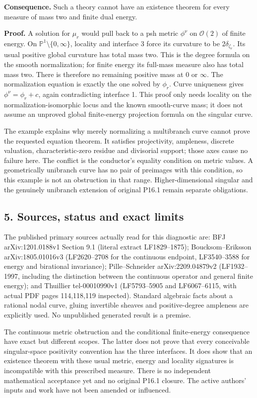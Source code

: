 \documentclass[
  11pt,
]{article}
\begin{document}
\textbf{Consequence.} Such a theory cannot have an existence theorem for
every measure of mass two and finite dual energy.

\textbf{Proof.} A solution for \(\mu_r\) would pull back to a psh metric
\(\phi^\nu\) on \(\mathcal O(2)\) of finite energy. On
\(\mathbb P^1\setminus\{0,\infty\}\), locality and interface 3 force its
curvature to be \(2\delta_{\zeta_r}\). Its usual positive global
curvature has total mass two. This is the degree formula on the smooth
normalization; for finite energy its full-mass measure also has total
mass two. There is therefore no remaining positive mass at \(0\) or
\(\infty\). The normalization equation is exactly the one solved by
\(\phi_r\). Curve uniqueness gives \(\phi^\nu=\phi_r+c\), again
contradicting interface 1. This proof only needs locality on the
normalization-isomorphic locus and the known smooth-curve mass; it does
not assume an unproved global finite-energy projection formula on the
singular curve.

The example explains why merely normalizing a multibranch curve cannot
prove the requested equation theorem. It satisfies projectivity,
ampleness, discrete valuation, characteristic-zero residue and
divisorial support; those axes cause no failure here. The conflict is
the conductor's equality condition on metric values. A geometrically
unibranch curve has no pair of preimages with this condition, so this
example is not an obstruction in that range. Higher-dimensional singular
and the genuinely unibranch extension of original P16.1 remain separate
obligations.

\subsection{5. Sources, status and exact
limits}\label{sources-status-and-exact-limits}

The published primary sources actually read for this diagnostic are: BFJ
arXiv:1201.0188v1 Section 9.1 (literal extract LF1829--1875);
Boucksom--Eriksson arXiv:1805.01016v3 (LF2620--2708 for the continuous
endpoint, LF3540--3588 for energy and birational invariance);
Pille--Schneider arXiv:2209.04879v2 (LF1932--1997, including the
distinction between the continuous operator and general finite energy);
and Thuillier tel-00010990v1 (LF5793--5905 and LF6067--6115, with actual
PDF pages 114,118,119 inspected). Standard algebraic facts about a
rational nodal curve, gluing invertible sheaves and positive-degree
ampleness are explicitly used. No unpublished generated result is a
premise.

The continuous metric obstruction and the conditional finite-energy
consequence have exact but different scopes. The latter does not prove
that every conceivable singular-space positivity convention has the
three interfaces. It does show that an existence theorem with these
usual metric, energy and locality signatures is incompatible with this
prescribed measure. There is no independent mathematical acceptance yet
and no original P16.1 closure. The active authors' inputs and work have
not been amended or influenced.
\end{document}
